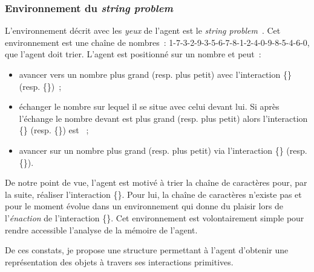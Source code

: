 \documentclass{llncs}
\begin{document}
\subsubsection{Environnement du \emph{string problem}}
\label{par:string_problem}
L'environnement décrit avec les \emph{yeux} de l'agent est le \emph{string problem}~\cite{Liris-6368-string-problem}. Cet environnement est une chaîne de nombres~: 1-7-3-2-9-3-5-6-7-8-1-2-4-0-9-8-5-4-6-0, que l'agent doit trier. L'agent est positionné sur un nombre et peut~:
\begin{itemize}
	\item avancer vers un nombre plus grand (resp. plus petit) avec l'interaction \{\carreBlanc\} (resp. \{\carreBleu\})~;
	\item échanger le nombre sur lequel il se situe avec celui devant lui. Si après l'échange le nombre devant est plus grand (resp. plus petit) alors l'interaction \{\rondBlanc\} (resp. \{\rondBleu\}) est \enact~;
	\item avancer sur un nombre plus grand (resp. plus petit) via l'interaction \{\triangleBlanc\} (resp. \{\triangleBleu\}).
\end{itemize} 
De notre point de vue, l'agent est motivé à trier la chaîne de caractères pour, par la suite, réaliser l'interaction \{\triangleBlanc\}. Pour lui, la chaîne de caractères n'existe pas et pour le moment évolue dans un environnement qui donne du plaisir lors de l'\emph{énaction} de l'interaction \{\triangleBlanc\}.
Cet environnement est volontairement simple pour rendre accessible l'analyse de la mémoire de l'agent.

De ces constats, je propose une structure permettant à l'agent d'obtenir une représentation des objets à travers ses interactions primitives.
\end{document}
